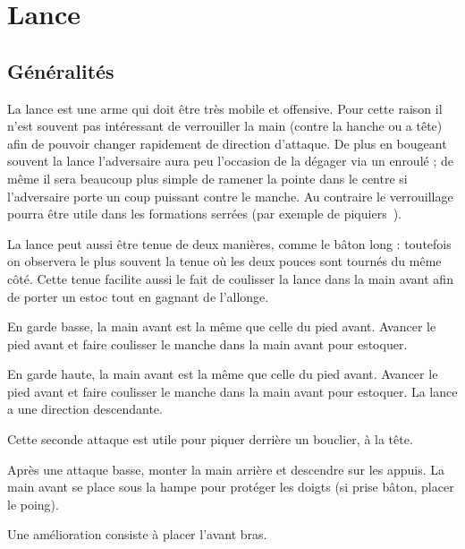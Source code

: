 \chapter{Lance}


\section{Généralités}

La lance est une arme qui doit être très mobile et offensive.
Pour cette raison il n'est souvent pas intéressant de verrouiller la main (contre la hanche ou a tête) afin de pouvoir changer rapidement de direction d'attaque.
De plus en bougeant souvent la lance l'adversaire aura peu l'occasion de la dégager via un enroulé ; de même il sera beaucoup plus simple de ramener la pointe dans le centre si l'adversaire porte un coup puissant contre le manche.
Au contraire le verrouillage pourra être utile dans les formations serrées (par exemple de piquiers~\footnotemark).

La lance peut aussi être tenue de deux manières, comme le bâton long : toutefois on observera le plus souvent la tenue où les deux pouces sont tournés du même côté.
Cette tenue facilite aussi le fait de coulisser la lance dans la main avant afin de porter un estoc tout en gagnant de l'allonge.



\begin{coup}
En garde basse, la main avant est la même que celle du pied avant.
Avancer le pied avant et faire coulisser le manche dans la main avant pour estoquer.
\end{coup}


\begin{coup}
En garde haute, la main avant est la même que celle du pied avant.
Avancer le pied avant et faire coulisser le manche dans la main avant pour estoquer.
La lance a une direction descendante.
\end{coup}


Cette seconde attaque est utile pour piquer derrière un bouclier, à la tête.


\begin{technique}
Après une attaque basse, monter la main arrière et descendre sur les appuis.
La main avant se place sous la hampe pour protéger les doigts (si prise bâton, placer le poing).

Une amélioration consiste à placer l'avant bras.
\end{technique}


